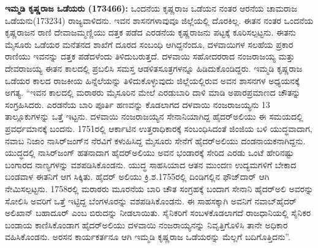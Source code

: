 \textbf{ಇಮ್ಮಡಿ ಕೃಷ್ಣರಾಜ ಒಡೆಯರು (1734\general{\enginline{-}}66): } ಒಂದನೆಯ ಕೃಷ್ಣರಾಜ ಒಡೆಯನ ನಂತರ ಆರನೆಯ ಚಾಮರಾಜ ಒಡೆಯನು(1732\enginline{-}34) ರಾಜ್ಯವಾಳಿದನು. ಇವನ ಶಾಸನಗಳಾವುವೂ ಜಿಲ್ಲೆಯಲ್ಲಿ ದೊರಕಿಲ್ಲ. ಈತನ ನಂತರ ಒಂದನೆಯ ಕೃಷ್ಣರಾಜನ ರಾಣಿ ದೇವಾಜಮ್ಮಣ್ಣಿಯು ದತ್ತಕ ಪಡೆದ ಎರಡನೆಯ ಕೃಷ್ಣರಾಜನು ಪಟ್ಟಕ್ಕೆ ಕೂರಿಸಲ್ಪಟ್ಟನು. ಈತನು ಮೈಸೂರು ಒಡೆಯರ ಮನೆತನದ ಶಾಖೆಗೆ  ದೂರದ ಸಂಬಂಧಿ ಆಗಿದ್ದನೆಂದೂ, ದಳವಾಯಿಗಳ ಸಲಹೆಯ ಪ್ರಕಾರ ರಾಣಿಯು ಇವನನ್ನು ದತ್ತಕ ಪಡೆದಳೆಂದು ತಿಳಿದುಬರುತ್ತದೆ. ದಳವಾಯಿ ಸಹೋದರರಾದ ನಂಜರಾಜಯ್ಯ ಮತ್ತು ದೇವರಾಜಯ್ಯ ಈತನ ಕಾಲದಲ್ಲಿ ಪ್ರಬಲಿಸಿ ಸಮಸ್ತ ಆಡಳಿತಸೂತ್ರಗಳನ್ನೂ ಹಿಡಿದುಕೊಂಡಿದ್ದರು. ಇಮ್ಮಡಿ ಕೃಷ್ಣರಾಜ ಒಡೆಯರ ಕಾಲದ ರಾಜಕೀಯ ಹಿನ್ನೆಲೆಯನ್ನು ತಿಳಿದುಕೊಳ್ಳುವುದು ಜಿಲ್ಲೆಯಲ್ಲಿರುವ ಅವನ ಶಾಸನಗಳ ಅಧ್ಯಯನಕ್ಕೆ ಅಗತ್ಯ. “ಇವನ ಕಾಲದಲ್ಲಿ ಮರಾಠರು ಮೈಸೂರಿನ ಮೇಲೆ ಎರಡುಬಾರಿ ದಾಳಿ ಮಾಡಿ ಅಪಾರಪ್ರಮಾಣದ ಚೌತನ್ನು ಸಂಗ್ರಹಿಸಿದರು. ಎರಡನೆಯ ಬಾರಿ ಪೂರ್ತಿ ಹಣವನ್ನು ಕೊಡಲಾಗದ ದಳವಾಯಿ ನಂಜರಾಜಯ್ಯನು 13 ತಾಲ್ಲೂಕುಗಳನ್ನು ಒತ್ತೆ ಇಟ್ಟನು. ದಳವಾಯಿ ನಂಜರಾಜಯ್ಯನ ಸೇನಾನಿಯಾಗಿದ್ದ ಹೈದರ್​ಅಲಿಯು ಈ ಸಮಯದಲ್ಲಿ ಪ್ರವರ್ಧಮಾನಕ್ಕೆ ಬಂದನು. 1751ರಲ್ಲಿ ಆರ್ಕಾಟಿನ ಉತ್ತರಾಧಿಕಾರಕ್ಕೆ ಸಂಬಂಧಿಸಿದಂತೆ ಜಿಂಜಿಯ ಬಳಿ ಯುದ್ಧವಾದಾಗ, ನವಾಬ ನಿಜಾಂ ನಾಸಿರ್​ಜಂಗ್​ನ ನೆರವಿಗೆ ಕಳುಹಿಸಿದ್ದ ಮೈಸೂರು ಸೇನೆಗೆ ಹೈದರ್​ಅಲಿಯು ದಂಡನಾಯಕನಾಗಿದ್ದನು. ಯುದ್ಧದಲ್ಲಿ ನಾಸಿರ್​ಜಂಗ್​ ಹತನಾದಾಗ ಹೈದರ್​ಅಲಿಯು ಅವನ ಭಂಡಾರಕ್ಕೆ ಸೇರಿದ ಎರಡು ಒಂಟೆ ಹೇರಿನಷ್ಟು ಬಂಗಾರದ ನಾಣ್ಯಗಳನ್ನು ವಶಪಡಿಸಿಕೊಂಡನು. ಯುದ್ಧ ಸಾಹಸಿಯಾದ ಆತನ ಮುಂದಣ ಉದ್ಯಮಗಳಿಗೆ ಬೇಕಾದ ಬಂಡವಾಳ ಈತನಿಗೆ ಆಗ ಸಿಕ್ಕಿತು. ಹೈದರ್​ ಅಲಿಯು ಕ್ರಿ.ಶ.1755ರಲ್ಲಿ ದಿಂಡಿಗಲ್ಲಿನ ಫೌಜ್​ದಾರ್​ ಆಗಿ ನೇಮಿಸಲ್ಪಟ್ಟನು. 1758ರಲ್ಲಿ ಮರಾಠರು ಮೂರನೆಯ ಬಾರಿ ಚೌತ ಸಂಗ್ರಹಕ್ಕೆ ಬಂದಾಗ ಸೇನಾನಿ ಹೈದರ್​ಅಲಿ ಅವರನ್ನು ಸೋಲಿಸಿ ಅವರಿಗೆ ಒತ್ತೆ ಇಟ್ಟಿದ್ದ ಬೆಂಗಳೂರನ್ನು ವಶಪಡಿಸಿಕೊಂಡನು. ಈ ಸಾಹಸಕ್ಕಾಗಿ ಅವನಿಗೆ ನವಾಬ್​ ಹೈದರ್​ಅಲಿಖಾನ್​ ಬಹಾದೂರ್​ ಎಂಬ ಬಿರುದನ್ನು ನೀಡಲಾಯಿತು. ಸೈನಿಕರಿಗೆ ಸಂಬಳಕೊಡಲಾಗದೆ ರಾಜಧಾನಿಯಲ್ಲಿ ಸೈನಿಕರ ಬಂಡಾಯ ಕಾಣಿಸಿ\-ಕೊಂಡಾಗ ಹೈದರ್​ಅಲಿಯು ದಳವಾಯಿ ನಂಜರಾಯ್ಯನನ್ನು ನಿವೃತ್ತಿಗೊಳಿಸಿ ತಾನೇ ಅಧಿಕಾರ ವಹಿಸಿಕೊಂಡನು. ಅರಸನ ಕಾರ್ಯಕರ್ತನೂ ಆಗಿ ಇಮ್ಮಡಿ ಕೃಷ್ಣರಾಜ ಒಡೆಯರನ್ನು ಮೆಲ್ಲಗೆ ಬದಿಗೊತ್ತಿದನು”.

